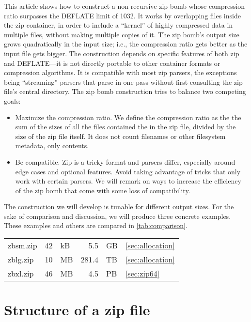 \documentclass[letterpaper,twocolumn,10pt]{article}
\begin{document}
This article shows how to construct a non-recursive zip bomb
whose compression ratio surpasses the DEFLATE limit of 1032.
It works by overlapping files inside the zip container,
in order to include a ``kernel'' of highly compressed data
in multiple files, without making multiple copies of it.
The zip bomb's output size grows quadratically in the input size; i.e.,
the compression ratio gets better as the input file gets bigger.
The construction depends on specific features of both zip and DEFLATE---it
is not directly portable to other container formats or compression algorithms.
It is compatible with most zip parsers,
the exceptions being ``streaming'' parsers that
parse in one pass without first consulting the zip file's central directory.
The zip bomb construction tries to balance
two competing goals:
\begin{itemize}
\item
Maximize the compression ratio.
We define the compression ratio as the the sum of the sizes
of all the files contained the in the zip file,
divided by the size of the zip file itself.
It does not count filenames or other filesystem metadata,
only contents.
\item
Be compatible.
Zip is a tricky format and parsers differ, especially
around edge cases and optional features.
Avoid taking advantage of tricks that only work with certain parsers.
We will remark on ways to increase the efficiency of the zip bomb
that come with some loss of compatibility.
\end{itemize}

The construction we will develop is tunable for different output sizes.
For the sake of comparison and discussion,
we will produce three concrete examples.
These examples and others are compared in \autoref{tab:comparison}.

\begin{center}
\begin{tabular}{lr@{~}l@{${} \rightarrow {}$}r@{~}ll}
zbsm.zip & \num{42} & kB & \num{5.5}   & GB & \autoref{sec:allocation} \\
zblg.zip & \num{10} & MB & \num{281.4} & TB & \autoref{sec:allocation} \\
zbxl.zip & \num{46} & MB & \num{4.5}   & PB & \autoref{sec:zip64}
\end{tabular}
\end{center}


\section{Structure of a zip file}
\label{sec:zipstructure}
\end{document}
